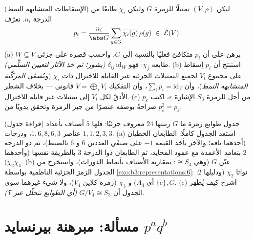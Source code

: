 \begin{exercise}[$\star\star$]\label{exo:b3:representations:11}
(الإسقاطات المتشابهة النمط) ليكن $(V, \rho)$ تمثيلًا للزمرة $G$
وليكن $\chi_i$ طابعًا  من الدرجة $n_i$. نعرّف
\[
p_i = \frac{n_i}{\abs G}\sum_{g\in G}
\overline{\chi_i(g)}\,\rho(g) \;\in\; \mathcal L(V).
\]
(a) برهن على أن $p_i$ متكافئ فعليًا بالنسبة إلى $G$، واحسب قصره
على  جزئي  $W \subseteq
V$ طابعه $\chi_j$: فهو
$\delta_{ij}\,
\mathrm{id}_W$ \emph{(بشور؛ ثم خذ الآثار لتعيين السلَّمي)}.
(b) استنتج أن $p_i$ إسقاط على مجموع $V_i$ لجميع التمثيلات
الجزئية غير القابلة للاختزال ذات  $\chi_i$ (ويُسمّى
\emph{المركّبة المتشابهة النمط})، وأن $\sum_ip_i =
\mathrm{id}_V$، وأن التفكيك
$V =
\bigoplus_iV_i$ قانوني --- بخلاف الشطر الأدقّ لكل $V_i$ إلى تمثيلات غير
قابلة للاختزال.
(c) من أجل  للزمرة $S_3$  الإشارة
$\varepsilon$، اكتب $p_\varepsilon$ صراحةً بوصفه عنصرًا من جبر
الزمرة وتحقق يدويًا من $p_\varepsilon^2
= p_\varepsilon$.
\end{exercise}

\begin{exercise}[$\star\star$]\label{exo:b3:representations:12}
(قراءة جدول) جدول طوابع زمرة ما $G$ رتبتها $24$ معروف جزئيًا:
فلها $5$ أصناف بأعداد عناصر $1, 6, 8, 6, 3$، ودرجات
$1, 1, 2, 3, 3$.
(a) استعد الجدول كاملًا: الطابعان الخطيان (أحدهما تافه؛ والآخر
يأخذ القيمة $-1$ على صنفَي العددين $6$ و $6$ بالضبط)، ثم 
ذو الدرجة $2$ بتعامد الأعمدة مع عمود المحايد، ثم الطابعان ذوا
الدرجة $3$ بالطريقة نفسها (وأحدهما $\chi_2\chi_4$).
(b) عيّن $G$ (وهي $\cong S_4$: بمقارنة الأصناف بأنماط الدورات)،
واستخرج من الجدول الزمرَ الجزئية الناظمية بواسطة \cref{exo:b3:representations:6}:
نواتا $\chi_2$ (ودليلها $2$: أي $A_4$) و $\chi_3$ (زمرة كلاين
$V_4$)، ولا شيء غيرهما سوى $\{e\}, G$.
(c) اشرح كيف يُظهر الجدول أن $G/V_4 \cong S_3$ \emph{(أي الطوابع تتحلّل
عبر ؟)}.
\end{exercise}

\section{مسألة: مبرهنة بيرنسايد \texorpdfstring{$p^aq^b$}{p^a q^b}}

